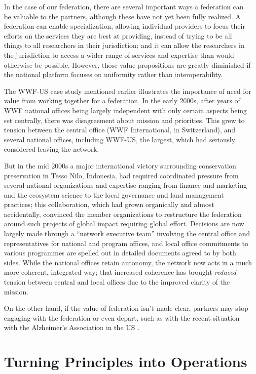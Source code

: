 \documentclass[11pt, letterpaper, twoside]{article}
\begin{document}
In the case of our federation, there are several important ways a
federation can be valuable to the partners, although these have not yet
been fully realized. A federation can enable specialization, allowing
individual providers to focus their efforts on the services they are
best at providing, instead of trying to be all things to all researchers
in their jurisdiction; and it can allow the researchers in the
jurisdiction to access a wider range of services and expertise than
would otherwise be possible. However, those value propositions are
greatly diminished if the national platform focuses on uniformity rather
than interoperability.

The WWF-US case study mentioned earlier illustrates the importance of
need for value from working together for a federation. In the early
2000s, after years of WWF national offices being largely independent
with only certain aspects being set centrally, there was disagreement
about mission and priorities. This grew to tension between the central
office (WWF International, in Switzerland), and several national
offices, including WWF-US, the largest, which had seriously considered
leaving the network.

But in the mid 2000s a major international victory surrounding
conservation preservation in Tesso Nilo, Indonesia, had required
coordinated pressure from several national organizations and expertise
ranging from finance and marketing and the ecosystem science to the
local governance and land management practices; this collaboration,
which had grown organically and almost accidentally, convinced the
member organizations to restructure the federation around such projects
of global impact requiring global effort. Decisions are now largely made
through a ``network executive team'' involving the central office and
representatives for national and program offices, and local office
commitments to various programmes are spelled out in detailed documents
agreed to by both sides. While the national offices retain autonomy, the
network now acts in a much more coherent, integrated way; that increased
coherence has brought \emph{reduced} tension between central and local
offices due to the improved clarity of the mission.

On the other hand, if the value of federation isn't made clear, partners
may stop engaging with the federation or even depart, such as with the
recent situation with the Alzheimer's Association in the US \citep{alzheimers}.

\section*{Turning Principles into Operations}
%
%
\end{document}
